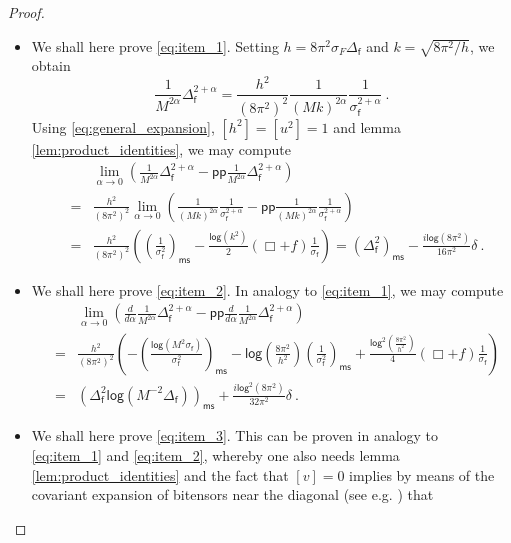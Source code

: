 \documentclass[11pt]{book}
\newcommand{\pp}{\mathsf{pp}}
\newcommand{\ms}{\mathsf{ms}}
\renewcommand{\log}{\mathsf{log}}
\newcommand{\fsf}{\mathsf{f}}
\theoremstyle{break}
\begin{document}
\begin{proof}
\begin{itemize}
\item We shall here prove \ref{eq:item_1}. Setting $h=8\pi^2\sigma_F \Delta_\fsf$ and $k=\sqrt{8\pi^2/h}$, we obtain
%
\begin{equation*}
\frac{1}{M^{2\alpha}} \Delta_\fsf^{2+\alpha} = \frac{h^2}{(8\pi^2)^2} \frac{1}{(Mk)^{2\alpha}} \frac{1}{\sigma_\fsf^{2+\alpha}} \ . 
\end{equation*}
%
Using \eqref{eq:general_expansion}, $[h^2]=[u^2]=1$ and lemma \ref{lem:product_identities}, we may compute
%
\begin{eqnarray*}
&& \lim_{\alpha\to 0} \left(\frac{1}{M^{2\alpha}} \Delta_\fsf^{2+\alpha} - \pp\frac{1}{M^{2\alpha}} \Delta_\fsf^{2+\alpha} \right) \\
%
&=& \frac{h^2}{(8\pi^2)^2} \lim_{\alpha\to 0} \left(\frac{1}{(Mk)^{2\alpha}} \frac{1}{\sigma_\fsf^{2+\alpha}} - \pp\frac{1}{(Mk)^{2\alpha}} \frac{1}{\sigma_\fsf^{2+\alpha}} \right) \\
%
&=& \frac{h^2}{(8\pi^2)^2} \left(\left(\frac{1}{\sigma^2_\fsf}\right)_\ms - \frac{\log (k^2)}{2} \left(\Box + f\right) \frac{1}{\sigma_\fsf}\right) = (\Delta^2_\fsf)_\ms - \frac{i\log(8\pi^2)}{16\pi^2} \delta \ . 
\end{eqnarray*}
%
%
%
%
\item We shall here prove \ref{eq:item_2}. In analogy to \ref{eq:item_1}, we may compute
%
\begin{eqnarray*}
&& \lim_{\alpha\to 0} \left(\frac{d}{d\alpha} \frac{1}{M^{2\alpha}} \Delta_\fsf^{2+\alpha} - \pp\frac{d}{d\alpha} \frac{1}{M^{2\alpha}} \Delta_\fsf^{2+\alpha} \right) \\
%
&=& \frac{h^2}{(8\pi^2)^2} \left(-\left(\frac{\log \left(M^2 \sigma_\fsf\right)}{\sigma^2_\fsf}\right)_\ms - \log\left(\frac{8\pi^2}{h^2}\right) \left(\frac{1}{\sigma^2_\fsf}\right)_\ms + \frac{\log^2 \left(\frac{8\pi^2}{h^2}\right)}{4}\left(\Box + f\right)\frac{1}{\sigma_\fsf}\right) \\
%
&=& \left(\Delta^2_\fsf \log \left(M^{-2}\Delta_\fsf \right)\right)_\ms + \frac{i\log^2(8\pi^2)}{32\pi^2} \delta \ . 
\end{eqnarray*}
%
%
%
%
\item We shall here prove \ref{eq:item_3}. This can be proven in analogy to \ref{eq:item_1} and \ref{eq:item_2}, whereby one also needs lemma \ref{lem:product_identities} and the fact that $[v]=0$ implies by means of the covariant expansion of bitensors near the diagonal (see e.g. \cite[Section 5]{PPV_2011}) that 

\end{itemize}
\end{proof}
\end{document}
